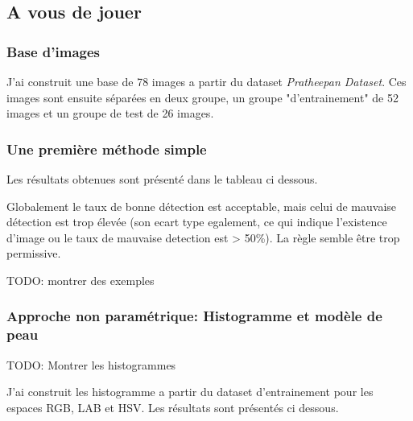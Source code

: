 \documentclass{article}
\begin{document}
\subsection{A vous de jouer}
\subsubsection{Base d'images}
J'ai construit une base de 78 images a partir du dataset \emph{Pratheepan Dataset}. Ces images sont ensuite séparées en deux groupe, un groupe "d'entrainement" de 52 images et un groupe de test de 26 images.

\subsubsection{Une première méthode simple}
Les résultats obtenues sont présenté dans le tableau ci dessous.

\begin{table}[h!]
\centering
{}
\caption{Résultats de la méthode de Peer et Al.}
\label{peer-et-al}
\end{table}


 Globalement le taux de bonne détection est acceptable, mais celui de mauvaise détection est trop élevée (son ecart type egalement, ce qui indique l'existence d'image ou le taux de mauvaise detection est > 50\%). La règle semble être trop permissive.

TODO: montrer des exemples

\subsubsection{Approche non paramétrique: Histogramme et modèle de peau}

TODO: Montrer les histogrammes

J'ai construit les histogramme a partir du dataset d'entrainement pour les espaces RGB, LAB et HSV. Les résultats sont présentés ci dessous.
\end{document}
